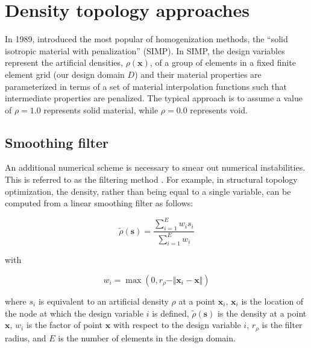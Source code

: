 
\section{Density topology approaches}
\label{sec:density_topology_approaches}

In 1989, \citet{Bendsoe:89,ZR:91} introduced the most popular of homogenization methods, the ``solid isotropic material with penalization'' (SIMP). In SIMP, the design variables represent the artificial densities, $\rho\left(\mathbf{x}\right)$, of a group of elements in a fixed finite element grid (our design domain $D$) and their material properties are parameterized in terms of a set of material interpolation functions such that intermediate properties are penalized. The typical approach is to assume a value of $\rho=1.0$ represents solid material, while $\rho=0.0$ represents void.


\subsection{Smoothing filter}
\label{sec:smoothing_filter}

An additional numerical scheme is necessary to smear out numerical instabilities. This is referred to as the filtering method \citep{Sigmund:01a,Sigmund:01b}. For example, in structural topology optimization, the density, rather than being equal to a single variable, can be computed from a linear smoothing filter as follows:

\begin{equation}
	\label{eq:smoothing_filter_SIMP}
	\tilde{\rho}\left(\mathbf{s}\right)=\frac{\sum_{i=1}^{E}w_{i}s_{i}}{\sum_{i=1}^{E}w_{i}}
\end{equation}

with

\begin{equation}
	\label{eq:weight_SIMP}
	w_{i}=\max \left( 0, r_{\rho} - \Vert \mathbf{x}_i - \mathbf{x} \Vert \right)
\end{equation}

where $s_{i}$ is equivalent to an artificial density $\rho$ at a point $\mathbf{x}_{i}$, $\mathbf{x}_{i}$ is the location of the node at which the design variable $i$ is defined, $\tilde{\rho}\left(\mathbf{s}\right)$ is the density at a point $\mathbf{x}$,  $w_{i}$ is the factor of point $\mathbf{x}$ with respect to the design variable $i$, $r_{\rho}$ is the filter radius, and $E$ is the number of elements in the design domain.

